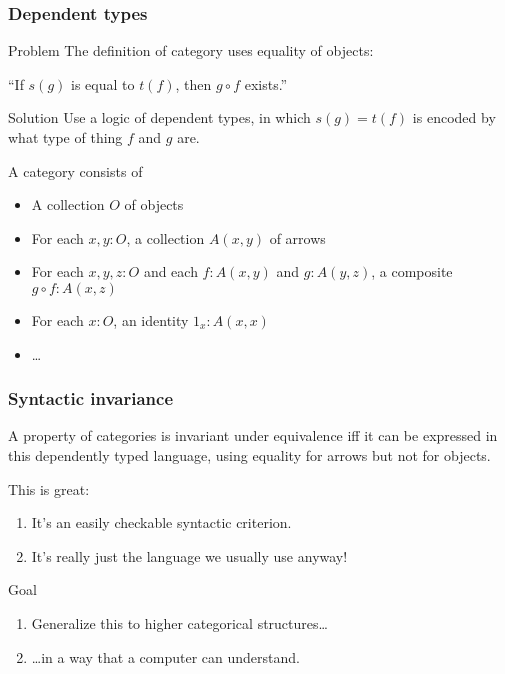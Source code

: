 \documentclass{beamer}
\begin{document}
\begin{frame}
  \frametitle{Dependent types}
  \begin{block}{Problem}
    The \alert<1>{definition} of category uses equality of objects:
    \begin{center}
      ``If $s(g)$ is \alert<1>{equal to} $t(f)$, then $g\circ f$ exists.''
    \end{center}
  \end{block}
  \begin{block}{Solution}
    Use a logic of {dependent types}, in which $s(g)=t(f)$ is encoded by what {type of thing} $f$ and $g$ are.
  \end{block}
  A category consists of
  \begin{itemize}
  \item A collection $O$ of objects
  \item For each $x,y:O$, a collection $A(x,y)$ of arrows
  \item For each $x,y,z:O$ and each $f:A(x,y)$ and $g:A(y,z)$, a composite $g\circ f: A(x,z)$
  \item For each $x:O$, an identity $1_x:A(x,x)$
  \item \dots
  \end{itemize}
\end{frame}

\begin{frame}
  \frametitle{Syntactic invariance}
  \begin{theorem}
    A {property} of categories is invariant under equivalence iff it can be expressed in this dependently typed language, using equality for arrows but not for objects.
  \end{theorem}
  This is great:
  \begin{enumerate}
  \item It's an easily checkable syntactic criterion.
  \item It's really just the language we usually use anyway!
  \end{enumerate}
  \pause
  \begin{block}{Goal}
    \begin{enumerate}
    \item Generalize this to higher categorical structures\dots
    \item \dots in a way that a computer can understand.
    \end{enumerate}
  \end{block}
\end{frame}
\end{document}
